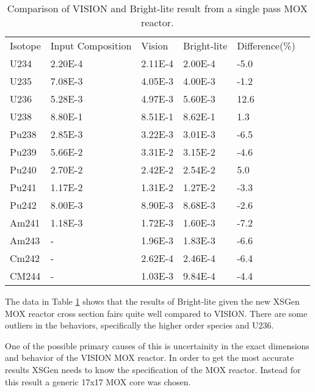 \documentclass{article}
\begin{document}
\begin{table}[!htb]
\centering
\caption{Comparison of VISION and Bright-lite result from a single pass MOX reactor.}
\label{tab:g}
\begin{tabular}{llllll}
Isotope & Input Composition & Vision & Bright-lite & Difference(\%) \\
U234 & 2.20E-4 & 2.11E-4 & 2.00E-4 & -5.0\\
U235 & 7.08E-3 & 4.05E-3 & 4.00E-3 & -1.2\\
U236 & 5.28E-3 & 4.97E-3 & 5.60E-3 & 12.6\\
U238 & 8.80E-1 & 8.51E-1 & 8.62E-1 & 1.3\\
Pu238 & 2.85E-3 & 3.22E-3 & 3.01E-3 & -6.5\\
Pu239 & 5.66E-2 & 3.31E-2 & 3.15E-2 & -4.6\\ 
Pu240 & 2.70E-2 & 2.42E-2 & 2.54E-2 & 5.0\\
Pu241 & 1.17E-2 & 1.31E-2 & 1.27E-2 & -3.3\\
Pu242 & 8.00E-3 & 8.90E-3 & 8.68E-3 & -2.6\\
Am241 & 1.18E-3 & 1.72E-3 & 1.60E-3 & -7.2\\
Am243 & - & 1.96E-3 & 1.83E-3 & -6.6\\
Cm242 & - & 2.62E-4 & 2.46E-4 & -6.4\\
CM244 & - & 1.03E-3 & 9.84E-4 & -4.4
\end{tabular}
\end{table}

The data in Table \ref{tab:g} shows that the results of Bright-lite given the new XSGen MOX reactor cross section fairs quite well compared to VISION. There are some outliers in the behaviors, specifically the higher order species and U236. 

One of the possible primary causes of this is uncertainity in the exact dimensions and behavior of the VISION MOX reactor. In order to get the most accurate results XSGen needs to know the specification of the MOX reactor. Instead for this result a generic 17x17 MOX core was chosen. 
\end{document}
